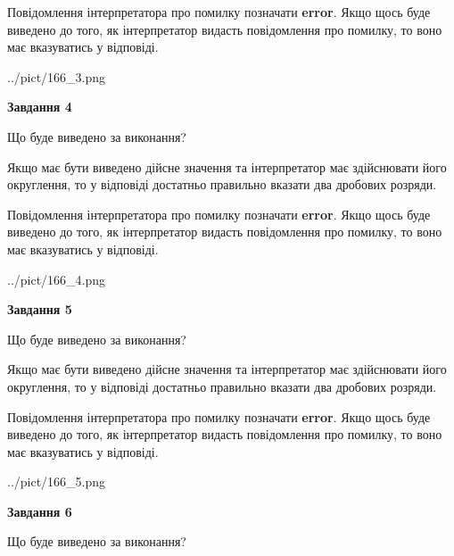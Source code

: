 \documentclass[12pt, ukrainian]{article}
\begin{document}
{\begin {Large}
Повідомлення інтерпретатора про помилку позначати \textbf{error}.
Якщо щось буде виведено до того, як інтерпретатор видасть повідомлення про помилку, 
то воно має вказуватись у відповіді. \par

\begin{center}
	{../pict/166_3.png}
\end{center}
\newpage

{\begin {center}\textbf{Завдання 4}\end {center}}\par
Що буде виведено за виконання? \par

Якщо має бути виведено дійсне значення та інтерпретатор має здійснювати його округлення, 
то у відповіді достатньо правильно вказати два дробових розряди.

Повідомлення інтерпретатора про помилку позначати \textbf{error}.
Якщо щось буде виведено до того, як інтерпретатор видасть повідомлення про помилку, 
то воно має вказуватись у відповіді. \par

\begin{center}
	{../pict/166_4.png}
\end{center}
\newpage

{\begin {center}\textbf{Завдання 5}\end {center}}\par
Що буде виведено за виконання? \par

Якщо має бути виведено дійсне значення та інтерпретатор має здійснювати його округлення, 
то у відповіді достатньо правильно вказати два дробових розряди.

Повідомлення інтерпретатора про помилку позначати \textbf{error}.
Якщо щось буде виведено до того, як інтерпретатор видасть повідомлення про помилку, 
то воно має вказуватись у відповіді. \par

\begin{center}
	{../pict/166_5.png}
\end{center}
\newpage

{\begin {center}\textbf{Завдання 6}\end {center}}\par
Що буде виведено за виконання? \par


\end{Large}}
\end{document}
